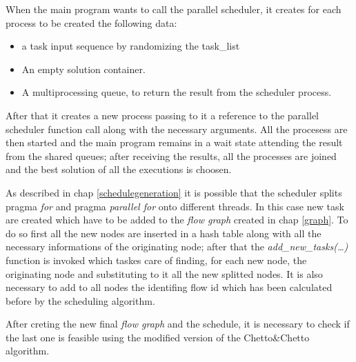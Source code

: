 \documentclass[a4paper,11pt,oneside]{book}
\begin{document}
When the main program wants to call the parallel scheduler, it creates for each process to be created the following data:
\begin{itemize}
\item {a task input sequence by randomizing the task\_list}
\item{An empty solution container.}
\item{A multiprocessing queue, to return the result from the scheduler process.}
\end{itemize}

After that it creates a new process passing to it a reference to the parallel scheduler function call along with the necessary arguments. All the procesess are then started and the main program remains in a wait state attending the result from the shared queues; after receiving the results, all the processes are joined and the best solution of all the executions is choosen.

As described in chap \ref{schedulegeneration} it is possible that the scheduler splits pragma \emph{for} and pragma \emph{parallel for} onto different threads. In this case new task are created which have to be added to the \emph{flow graph} created in chap \ref{graph}. To do so first all the new nodes are inserted in a hash table along with all the necessary informations of the originating node; after that the \emph{add\_new\_tasks(\dots)} function is invoked which taskes care of finding, for each new node, the originating node and substituting to it all the new splitted nodes. It is also necessary to add to all nodes the identifing flow id which has been calculated before by the scheduling algorithm.

After creting the new final \emph{flow graph} and the schedule, it is necessary to check if the last one is feasible using the modified version of the Chetto\&Chetto algorithm.
\end{document}
